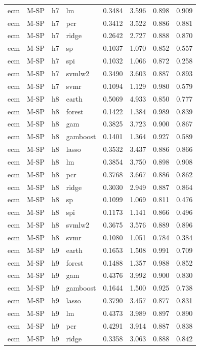 \begin{ThreePartTable}
\begin{longtable}[t]{llclcccc}
ecm & M-SP & h7 & lm & 0.3484 & 3.596 & 0.898 & 0.909\\
ecm & M-SP & h7 & pcr & 0.3412 & 3.522 & 0.886 & 0.881\\
ecm & M-SP & h7 & ridge & 0.2642 & 2.727 & 0.888 & 0.870\\
ecm & M-SP & h7 & sp & 0.1037 & 1.070 & 0.852 & 0.557\\
ecm & M-SP & h7 & spi & 0.1032 & 1.066 & 0.872 & 0.258\\
ecm & M-SP & h7 & svmlw2 & 0.3490 & 3.603 & 0.887 & 0.893\\
ecm & M-SP & h7 & svmr & 0.1094 & 1.129 & 0.980 & 0.579\\
\addlinespace
ecm & M-SP & h8 & earth & 0.5069 & 4.933 & 0.850 & 0.777\\
ecm & M-SP & h8 & forest & 0.1422 & 1.384 & 0.989 & 0.839\\
ecm & M-SP & h8 & gam & 0.3825 & 3.723 & 0.900 & 0.867\\
ecm & M-SP & h8 & gamboost & 0.1401 & 1.364 & 0.927 & 0.589\\
ecm & M-SP & h8 & lasso & 0.3532 & 3.437 & 0.886 & 0.866\\
ecm & M-SP & h8 & lm & 0.3854 & 3.750 & 0.898 & 0.908\\
ecm & M-SP & h8 & pcr & 0.3768 & 3.667 & 0.886 & 0.862\\
ecm & M-SP & h8 & ridge & 0.3030 & 2.949 & 0.887 & 0.864\\
ecm & M-SP & h8 & sp & 0.1099 & 1.069 & 0.811 & 0.476\\
ecm & M-SP & h8 & spi & 0.1173 & 1.141 & 0.866 & 0.496\\
ecm & M-SP & h8 & svmlw2 & 0.3675 & 3.576 & 0.889 & 0.896\\
ecm & M-SP & h8 & svmr & 0.1080 & 1.051 & 0.784 & 0.384\\
\addlinespace
ecm & M-SP & h9 & earth & 0.1653 & 1.508 & 0.991 & 0.709\\
ecm & M-SP & h9 & forest & 0.1488 & 1.357 & 0.988 & 0.852\\
ecm & M-SP & h9 & gam & 0.4376 & 3.992 & 0.900 & 0.830\\
ecm & M-SP & h9 & gamboost & 0.1644 & 1.500 & 0.925 & 0.738\\
ecm & M-SP & h9 & lasso & 0.3790 & 3.457 & 0.877 & 0.831\\
ecm & M-SP & h9 & lm & 0.4373 & 3.989 & 0.897 & 0.890\\
ecm & M-SP & h9 & pcr & 0.4291 & 3.914 & 0.887 & 0.838\\
ecm & M-SP & h9 & ridge & 0.3358 & 3.063 & 0.888 & 0.842\\

\end{longtable}
\end{ThreePartTable}
